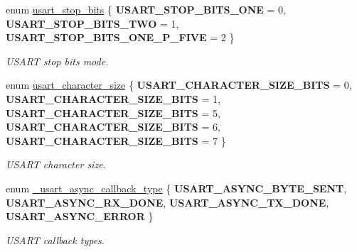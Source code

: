 \begin{DoxyCompactItemize}
\item 
\mbox{\label{group___h_p_l_ga88311517c5168c29a681604a8a33b06e}} 
enum \hyperlink{group___h_p_l_ga88311517c5168c29a681604a8a33b06e}{usart\+\_\+stop\+\_\+bits} \{ {\bfseries U\+S\+A\+R\+T\+\_\+\+S\+T\+O\+P\+\_\+\+B\+I\+T\+S\+\_\+\+O\+NE} = 0, 
{\bfseries U\+S\+A\+R\+T\+\_\+\+S\+T\+O\+P\+\_\+\+B\+I\+T\+S\+\_\+\+T\+WO} = 1, 
{\bfseries U\+S\+A\+R\+T\+\_\+\+S\+T\+O\+P\+\_\+\+B\+I\+T\+S\+\_\+\+O\+N\+E\+\_\+\+P\+\_\+\+F\+I\+VE} = 2
 \}\begin{DoxyCompactList}\small\item\em U\+S\+A\+RT stop bits mode. \end{DoxyCompactList}
\item 
\mbox{\label{group___h_p_l_ga631ce7b4f60dccd392e6d6ef7d3cd4e2}} 
enum \hyperlink{group___h_p_l_ga631ce7b4f60dccd392e6d6ef7d3cd4e2}{usart\+\_\+character\+\_\+size} \{ \newline
{\bfseries U\+S\+A\+R\+T\+\_\+\+C\+H\+A\+R\+A\+C\+T\+E\+R\+\_\+\+S\+I\+Z\+E\+\_\+B\+I\+TS} = 0, 
{\bfseries U\+S\+A\+R\+T\+\_\+\+C\+H\+A\+R\+A\+C\+T\+E\+R\+\_\+\+S\+I\+Z\+E\+\_\+B\+I\+TS} = 1, 
{\bfseries U\+S\+A\+R\+T\+\_\+\+C\+H\+A\+R\+A\+C\+T\+E\+R\+\_\+\+S\+I\+Z\+E\+\_\+B\+I\+TS} = 5, 
{\bfseries U\+S\+A\+R\+T\+\_\+\+C\+H\+A\+R\+A\+C\+T\+E\+R\+\_\+\+S\+I\+Z\+E\+\_\+B\+I\+TS} = 6, 
\newline
{\bfseries U\+S\+A\+R\+T\+\_\+\+C\+H\+A\+R\+A\+C\+T\+E\+R\+\_\+\+S\+I\+Z\+E\+\_\+B\+I\+TS} = 7
 \}\begin{DoxyCompactList}\small\item\em U\+S\+A\+RT character size. \end{DoxyCompactList}
\item 
\mbox{\label{group___h_p_l_gace00dc77ac02c91f8bf35551b484927c}} 
enum \hyperlink{group___h_p_l_gace00dc77ac02c91f8bf35551b484927c}{\+\_\+usart\+\_\+async\+\_\+callback\+\_\+type} \{ {\bfseries U\+S\+A\+R\+T\+\_\+\+A\+S\+Y\+N\+C\+\_\+\+B\+Y\+T\+E\+\_\+\+S\+E\+NT}, 
{\bfseries U\+S\+A\+R\+T\+\_\+\+A\+S\+Y\+N\+C\+\_\+\+R\+X\+\_\+\+D\+O\+NE}, 
{\bfseries U\+S\+A\+R\+T\+\_\+\+A\+S\+Y\+N\+C\+\_\+\+T\+X\+\_\+\+D\+O\+NE}, 
{\bfseries U\+S\+A\+R\+T\+\_\+\+A\+S\+Y\+N\+C\+\_\+\+E\+R\+R\+OR}
 \}\begin{DoxyCompactList}\small\item\em U\+S\+A\+RT callback types. \end{DoxyCompactList}
\end{DoxyCompactItemize}

